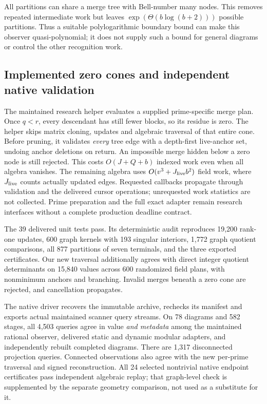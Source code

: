 All partitions can share a merge tree with Bell-number many nodes. This
removes repeated intermediate work but leaves
$\exp(\Theta(b\log(b+2)))$ possible partitions. Thus a suitable polylogarithmic
boundary bound can make this observer quasi-polynomial; it does not supply
such a bound for general diagrams or control the other recognition work.

\subsection{Implemented zero cones and independent native validation}

The maintained research helper
 evaluates a supplied
prime-specific merge plan. Once $q<r$, every descendant has still fewer
blocks, so its residue is zero. The helper skips matrix cloning, updates
and algebraic traversal of that entire cone. Before pruning, it validates
\emph{every} tree edge with a depth-first live-anchor set, undoing anchor
deletions on return. An impossible merge hidden below a zero node is still
rejected. This costs $O(J+Q+b)$ indexed work even when all algebra vanishes.
The remaining algebra uses $O(v^3+J_{\rm live}b^2)$ field work, where
$J_{\rm live}$ counts actually updated edges. Requested callbacks propagate
through validation and the delivered cursor operations; unrequested work
statistics are not collected. Prime preparation and the full exact adapter
remain research interfaces without a complete production deadline contract.

The 39 delivered unit tests pass. Its deterministic audit reproduces 19,200
rank-one updates, 600 graph kernels with 193 singular interiors, 1,772 graph
quotient comparisons, all 877 partitions of seven terminals, and the three
exported certificates. Our new traversal additionally agrees with direct
integer quotient determinants on 15,840 values across 600 randomized field
plans, with nonminimum anchors and branching. Invalid merges beneath a
zero cone are rejected, and cancellation propagates.

The native driver  recovers the immutable
archive, rechecks its manifest and exports actual maintained scanner query
streams. On 78 diagrams and 582 stages, all 4,503 queries agree in value
\emph{and metadata} among the maintained rational observer, delivered static
and dynamic modular adapters, and independently rebuilt completed diagrams.
There are 1,317 disconnected projection queries. Connected observations also
agree with the new per-prime traversal and signed reconstruction. All 24
selected nontrivial native endpoint certificates pass independent algebraic
replay; that graph-level check is supplemented by the separate geometry
comparison, not used as a substitute for it.

